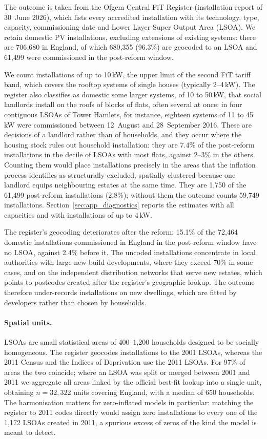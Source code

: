The outcome is taken from the Ofgem Central FiT Register (installation report of 30~June 2026), which lists every accredited installation with its technology, type, capacity, commissioning date and Lower Layer Super Output Area (LSOA).
We retain domestic PV installations, excluding extensions of existing systems: there are 706{,}680 in England, of which 680{,}355 (96.3\%) are geocoded to an LSOA and 61{,}499 were commissioned in the post-reform window.

We count installations of up to 10\,kW, the upper limit of the second FiT tariff band, which covers the rooftop systems of single houses (typically 2--4\,kW).
The register also classifies as domestic some larger systems, of 10 to 50\,kW, that social landlords install on the roofs of blocks of flats, often several at once: in four contiguous LSOAs of Tower Hamlets, for instance, eighteen systems of 11 to 45\,kW were commissioned between 12~August and 28~September 2016.
These are decisions of a landlord rather than of households, and they occur where the housing stock rules out household installation: they are 7.4\% of the post-reform installations in the decile of LSOAs with most flats, against 2--3\% in the others.
Counting them would place installations precisely in the areas that the inflation process identifies as structurally excluded, spatially clustered because one landlord equips neighbouring estates at the same time.
They are 1{,}750 of the 61{,}499 post-reform installations (2.8\%); without them the outcome counts 59{,}749 installations.
Section~\ref{sec:app_diagnostics} reports the estimates with all capacities and with installations of up to 4\,kW.

The register's geocoding deteriorates after the reform: 15.1\% of the 72{,}464 domestic installations commissioned in England in the post-reform window have no LSOA, against 2.4\% before it.
The uncoded installations concentrate in local authorities with large new-build developments, where they exceed 70\% in some cases, and on the independent distribution networks that serve new estates, which points to postcodes created after the register's geographic lookup.
The outcome therefore under-records installations on new dwellings, which are fitted by developers rather than chosen by households.

\paragraph{Spatial units.}
LSOAs are small statistical areas of 400--1{,}200 households designed to be socially homogeneous.
The register geocodes installations to the 2001 LSOAs, whereas the 2011 Census and the Indices of Deprivation use the 2011 LSOAs.
For 97\% of areas the two coincide; where an LSOA was split or merged between 2001 and 2011 we aggregate all areas linked by the official best-fit lookup into a single unit, obtaining $n = 32{,}322$ units covering England, with a median of 650 households.
The harmonisation matters for zero-inflated models in particular: matching the register to 2011 codes directly would assign zero installations to every one of the 1{,}172 LSOAs created in 2011, a spurious excess of zeros of the kind the model is meant to detect.

